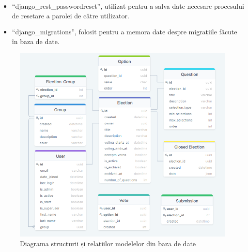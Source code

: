 \begin{itemize}
    \item \enquote{django\_rest\_passwordreset}, utilizat pentru a salva date necesare procesului de resetare a parolei de către utilizator.
    \item \enquote{django\_migrations}, folosit pentru a memora date despre migrațiile făcute în baza de date.
\end{itemize}

\begin{figure}[!h]
    \centering
    \includegraphics[width=135mm]{images/db_example.png}
    \caption{Diagrama structurii și relațiilor modelelor din baza de date}
\end{figure}
